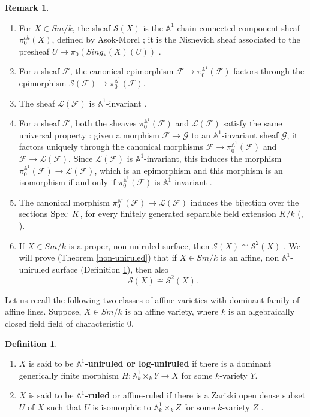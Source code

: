 \documentclass[11pt, reqno]{amsart}
\theoremstyle{plain}
\theoremstyle{definition}
\newtheorem{remark}[thm]{Remark}
\newtheorem{definition}[thm]{Definition}
\newcommand{\Spec}{{\rm Spec \,}}
\newcommand{\sF}{{\mathcal F}}
\newcommand{\sG}{{\mathcal G}}
\newcommand{\sL}{{\mathcal L}}
\newcommand{\sS}{{\mathcal S}}
\newcommand{\A}{{\mathbb A}}
\begin{document}
\begin{remark}
\begin{enumerate}
\item For $X \in Sm/k$, the sheaf $\sS(X)$ is the $\A^1$-chain connected component sheaf $\pi_0^{ch}(X)$, defined by Asok-Morel \cite[Definition 2.2.4]{am}; it is the Nisnevich sheaf associated to the presheaf $U \mapsto \pi_0(Sing_*(X)(U))$ \cite[Remark 2.10]{bhs}.
\item For a sheaf $\sF$, the canonical epimorphism $\sF \to \pi_0^{\A^1}(\sF)$ factors through the epimorphism $\sS(\sF) \to \pi_0^{\A^1}(\sF)$.
\item The sheaf $\sL(\sF)$ is $\A^1$-invariant \cite[Theorem 2.13]{bhs}.
\item For a sheaf $\sF$, both the sheaves $\pi_0^{\A^1}(\sF)$ and $\sL(\sF)$ satisfy the same universal property \cite[Remark 2.15]{bhs}: given a morphism $\sF \to \sG$ to an $\A^1$-invariant sheaf $\sG$, it factors uniquely through the canonical morphisms $\sF \to \pi_0^{\A^1}(\sF)$ and $\sF \to \sL(\sF)$. Since $\sL(\sF)$ is $\A^1$-invariant, this induces the morphism $\pi_0^{\A^1}(\sF) \to \sL(\sF)$, which is an epimorphism and  this morphism is an isomorphism if and only if $\pi_0^{\A^1}(\sF)$ is $\A^1$-invariant \cite[Corollary 2.18]{bhs}.
\item The canonical morphism $\pi_0^{\A^1}(\sF) \to \sL(\sF)$ induces the bijection over the sections $\Spec\ K$, for every finitely generated separable field extension $K/k$ (\cite[Corollary 2.2]{brs}, \cite[Corollary 2.15]{cb}).
\item If $X \in Sm/k$ is a proper, non-uniruled surface, then $\sS(X) \cong \sS^2(X)$ \cite[Theorem 3.14]{bhs}. We will prove (Theorem \ref{non-uniruled}) that if $X \in Sm/k$ is an affine, non $\A^1$-uniruled surface (Definition \ref{ruled-defn}), then also 
$$\sS(X) \cong \sS^2(X).$$
\end{enumerate}
\end{remark}
Let us recall the following two classes of affine varieties with dominant family of affine lines. Suppose, $X \in Sm/k$ is an affine variety, where $k$ is an algebraically closed field field of characteristic $0$.
\begin{definition}\label{ruled-defn}
\begin{enumerate}
\item $X$ is said to be \textbf{$\mathbb{A}^1$-uniruled or log-uniruled} if there is a dominant generically finite morphism $H: \mathbb{A}^1_k \times_k Y \to X$ for some $k$-variety $Y$. 
\item $X$ is said to be \textbf{$\mathbb{A}^1$-ruled} or affine-ruled if there is a Zariski open dense subset $U$ of $X$ such that $U$ is isomorphic to $\mathbb{A}^1_k \times_k Z$ for some $k$-variety $Z$ \cite[Section 2.1]{miyanishicrm}.
\end{enumerate}
\end{definition}
\end{document}
